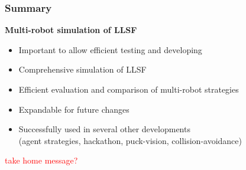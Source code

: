 \documentclass[]{beamer}
\begin{document}

\begin{frame}
  \frametitle{Summary}
  \textbf{\large Multi-robot simulation of LLSF}
  \begin{itemize}
  \item Important to allow efficient testing and developing
  \item Comprehensive simulation of LLSF
  \item Efficient evaluation and comparison of multi-robot strategies
  \item Expandable for future changes
  \item Successfully used in several other developments\\(agent strategies, hackathon, puck-vision, collision-avoidance)
  \end{itemize}
  \begin{block}{}
    \textcolor{red}{take home message?}
  \end{block}
\end{frame}
\end{document}
